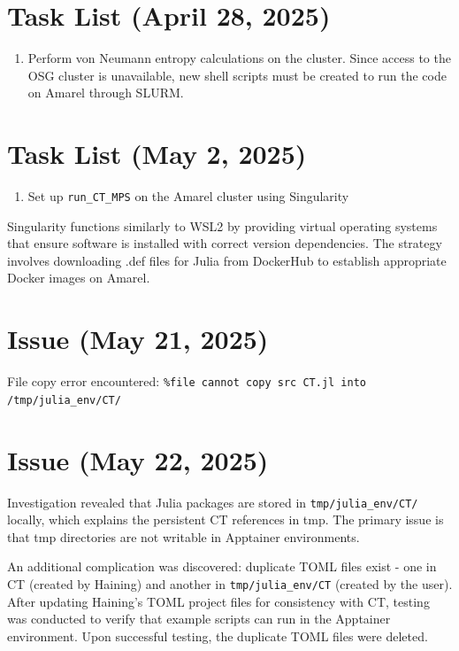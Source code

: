 \documentclass[11pt,a4paper]{article}
\begin{document}
\section{Task List (April 28, 2025)}

\begin{enumerate}
    \item Perform von Neumann entropy calculations on the cluster. Since access to the OSG cluster is unavailable, new shell scripts must be created to run the code on Amarel through SLURM.
\end{enumerate}

\section{Task List (May 2, 2025)}

\begin{enumerate}
    \item Set up \texttt{run\_CT\_MPS} on the Amarel cluster using Singularity
\end{enumerate}

Singularity functions similarly to WSL2 by providing virtual operating systems that ensure software is installed with correct version dependencies. The strategy involves downloading .def files for Julia from DockerHub to establish appropriate Docker images on Amarel.

\section{Issue (May 21, 2025)}

File copy error encountered: \texttt{\%file cannot copy src CT.jl into /tmp/julia\_env/CT/}

\section{Issue (May 22, 2025)}

Investigation revealed that Julia packages are stored in \texttt{tmp/julia\_env/CT/} locally, which explains the persistent CT references in tmp. The primary issue is that tmp directories are not writable in Apptainer environments.

An additional complication was discovered: duplicate TOML files exist - one in CT (created by Haining) and another in \texttt{tmp/julia\_env/CT} (created by the user). After updating Haining's TOML project files for consistency with CT, testing was conducted to verify that example scripts can run in the Apptainer environment. Upon successful testing, the duplicate TOML files were deleted.
\end{document}
